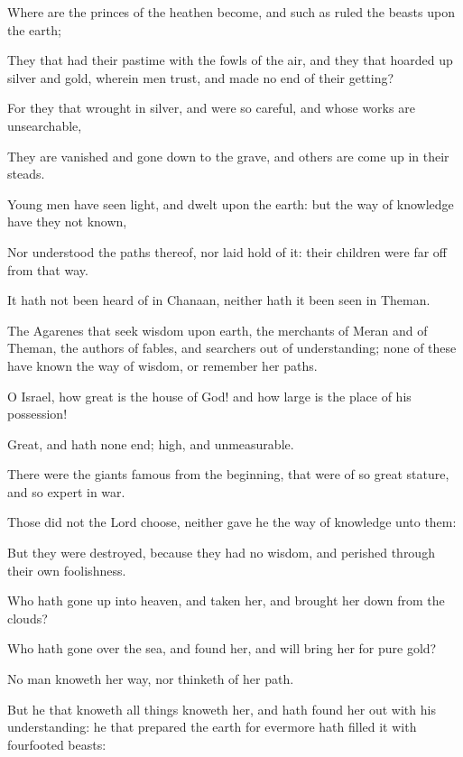 {\par }{\PP {}Where are the princes of the heathen become, and such as ruled the beasts upon the earth;
\par }{\PP {}They that had their pastime with the fowls of the air, and they that hoarded up silver and gold, wherein men trust, and made no end of their getting?
\par }{\PP {}For they that wrought in silver, and were so careful, and whose works are unsearchable,
\par }{\PP {}They are vanished and gone down to the grave, and others are come up in their steads.
\par }{\PP {}Young men have seen light, and dwelt upon the earth: but the way of knowledge have they not known,
\par }{\PP {}Nor understood the paths thereof, nor laid hold of it: their children were far off from that way.
\par }{\PP {}It hath not been heard of in Chanaan, neither hath it been seen in Theman.
\par }{\PP {}The Agarenes that seek wisdom upon earth, the merchants of Meran and of Theman, the authors of fables, and searchers out of understanding; none of these have known the way of wisdom, or remember her paths.
\par }{\PP {}O Israel, how great is the house of God! and how large is the place of his possession!
\par }{\PP {}Great, and hath none end; high, and unmeasurable.
\par }{\PP {}There were the giants famous from the beginning, that were of so great stature, and so expert in war.
\par }{\PP {}Those did not the Lord choose, neither gave he the way of knowledge unto them:
\par }{\PP {}But they were destroyed, because they had no wisdom, and perished through their own foolishness.
\par }{\PP {}Who hath gone up into heaven, and taken her, and brought her down from the clouds?
\par }{\PP {}Who hath gone over the sea, and found her, and will bring her for pure gold?
\par }{\PP {}No man knoweth her way, nor thinketh of her path.
\par }{\PP {}But he that knoweth all things knoweth her, and hath found her out with his understanding: he that prepared the earth for evermore hath filled it with fourfooted beasts:
}
